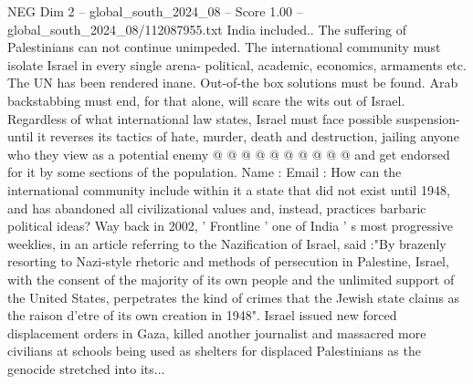 \begin{textsample}{NEG Dim 2 – global\_south\_2024\_08 – Score 1.00 – global\_south\_2024\_08/112087955.txt}
India included..
The suffering of Palestinians can not continue unimpeded.
The international community must isolate Israel in every single arena- political, academic, economics, armaments etc.
The UN has been rendered inane.
Out-of-the box solutions must be found.
Arab backstabbing must end, for that alone, will scare the wits out of Israel.
Regardless of what international law states, Israel must face possible suspension- until it reverses its tactics of hate, murder, death and destruction, jailing anyone who they view as a potential enemy @ @ @ @ @ @ @ @ @ @ and get endorsed for it by some sections of the population.
Name : Email : How can the international community include within it a state that did not exist until 1948, and has abandoned all civilizational values and, instead, practices barbaric political ideas?
Way back in 2002, ' Frontline ' one of India ' s most progressive weeklies, in an article referring to the Nazification of Israel, said :"By brazenly resorting to Nazi-style rhetoric and methods of persecution in Palestine, Israel, with the consent of the majority of its own people and the unlimited support of the United States, perpetrates the kind of crimes that the Jewish state claims as the raison d'etre of its own creation in 1948".
Israel issued new forced displacement orders in Gaza, killed another journalist and massacred more civilians at schools being used as shelters for displaced Palestinians as the genocide stretched into its...

\end{textsample}
